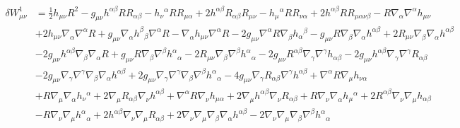 \documentclass[10pt,letterpaper]{article}
\numberwithin{equation}{section}
\begin{document}
\begin{align}
\delta W^1_{\mu\nu} &= \tfrac{1}{2} h_{\mu \nu} R^2 -  g_{\mu \nu} h^{\alpha \beta} R R_{\alpha \beta} -  h_{\nu}{}^{\alpha} R R_{\mu \alpha} + 2 h^{\alpha \beta} R_{\alpha \beta} R_{\mu \nu} -  h_{\mu}{}^{\alpha} R R_{\nu \alpha} + 2 h^{\alpha \beta} R R_{\mu \alpha \nu \beta} -  R \nabla_{\alpha}\nabla^{\alpha}h_{\mu \nu}\\
& + 2 h_{\mu \nu} \nabla_{\alpha}\nabla^{\alpha}R + g_{\mu \nu} \nabla_{\alpha}h^{\beta}{}_{\beta} \nabla^{\alpha}R -  \nabla_{\alpha}h_{\mu \nu} \nabla^{\alpha}R - 2 g_{\mu \nu} \nabla^{\alpha}R \nabla_{\beta}h_{\alpha}{}^{\beta} -  g_{\mu \nu} R \nabla_{\beta}\nabla_{\alpha}h^{\alpha \beta} + 2 R_{\mu \nu} \nabla_{\beta}\nabla_{\alpha}h^{\alpha \beta} \nonumber \\
& - 2 g_{\mu \nu} h^{\alpha \beta} \nabla_{\beta}\nabla_{\alpha}R + g_{\mu \nu} R \nabla_{\beta}\nabla^{\beta}h^{\alpha}{}_{\alpha} - 2 R_{\mu \nu} \nabla_{\beta}\nabla^{\beta}h^{\alpha}{}_{\alpha} - 2 g_{\mu \nu} R^{\alpha \beta} \nabla_{\gamma}\nabla^{\gamma}h_{\alpha \beta} - 2 g_{\mu \nu} h^{\alpha \beta} \nabla_{\gamma}\nabla^{\gamma}R_{\alpha \beta} \nonumber \\
& - 2 g_{\mu \nu} \nabla_{\gamma}\nabla^{\gamma}\nabla_{\beta}\nabla_{\alpha}h^{\alpha \beta} + 2 g_{\mu \nu} \nabla_{\gamma}\nabla^{\gamma}\nabla_{\beta}\nabla^{\beta}h^{\alpha}{}_{\alpha} - 4 g_{\mu \nu} \nabla_{\gamma}R_{\alpha \beta} \nabla^{\gamma}h^{\alpha \beta} + \nabla^{\alpha}R \nabla_{\mu}h_{\nu \alpha} \nonumber \\
& + R \nabla_{\mu}\nabla_{\alpha}h_{\nu}{}^{\alpha} + 2 \nabla_{\mu}R_{\alpha \beta} \nabla_{\nu}h^{\alpha \beta} + \nabla^{\alpha}R \nabla_{\nu}h_{\mu \alpha} + 2 \nabla_{\mu}h^{\alpha \beta} \nabla_{\nu}R_{\alpha \beta} + R \nabla_{\nu}\nabla_{\alpha}h_{\mu}{}^{\alpha} + 2 R^{\alpha \beta} \nabla_{\nu}\nabla_{\mu}h_{\alpha \beta}\nonumber \\
& -  R \nabla_{\nu}\nabla_{\mu}h^{\alpha}{}_{\alpha} + 2 h^{\alpha \beta} \nabla_{\nu}\nabla_{\mu}R_{\alpha \beta} + 2 \nabla_{\nu}\nabla_{\mu}\nabla_{\beta}\nabla_{\alpha}h^{\alpha \beta} - 2 \nabla_{\nu}\nabla_{\mu}\nabla_{\beta}\nabla^{\beta}h^{\alpha}{}_{\alpha} \nonumber 
\end{align}
\end{document}
